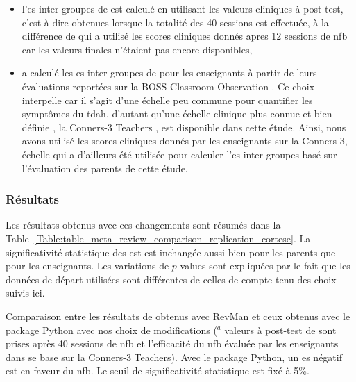 \begin{itemize}
\item l'\gls{es}-inter-groupes de \citet{Arnold2014} est calculé en utilisant les valeurs cliniques à post-test, c'est à dire obtenues lorsque la totalité 
des 40 sessions est effectuée, à la différence de \citet{Cortese2016} qui a utilisé les scores cliniques donnés apres 12 sessions de \gls{nfb} car les valeurs 
finales n'étaient pas encore disponibles,
\item \citet{Cortese2016} a calculé les \gls{es}-inter-groupes de \citet{Steiner2014} pour les enseignants à partir de leurs évaluations reportées sur 
la BOSS Classroom Observation \citep{Shapiro2010}. Ce choix interpelle car il s'agit d'une échelle peu commune pour quantifier les symptômes du \gls{tdah}, d'autant qu'une échelle clinique 
plus connue et bien définie \citep{Collett2003, Epstein2012, Bluschke2016}, la Conners-3 Teachers \citep{Conners1998, Conners2008}, est disponible dans 
cette étude. Ainsi, nous avons utilisé les scores cliniques donnés par les enseignants sur la Conners-3, échelle 
qui a d'ailleurs été utilisée pour calculer l'\gls{es}-inter-groupes basé sur l'évaluation des parents de cette étude. 
\end{itemize}

\subsubsection{Résultats}

Les résultats obtenus avec ces changements sont résumés dans la Table~\ref{Table:table_meta_review_comparison_replication_cortese}.
La significativité statistique des \gls{est} est inchangée aussi bien pour les parents que pour les enseignants. Les variations de $p$-values sont expliquées
par le fait que les données de départ utilisées sont différentes de celles de \citet{Cortese2016} compte tenu des choix suivis ici.

\begin{table}[h!]
  \centering
  \caption[Comparaison entre les résultats de \citet{Cortese2016} et ceux de la réplication avec nos choix de modifications.]{Comparaison entre les résultats de \citet{Cortese2016} obtenus avec RevMan \citep{Revman} et ceux obtenus avec le package Python \citep{Bussalb2019clinical}
	avec nos choix de modifications ($^a$ valeurs à post-test de \citet{Arnold2014} sont prises après 40 sessions de \gls{nfb} et l'efficacité du \gls{nfb} évaluée 
	par les enseignants dans \citet{Steiner2014} se base sur la Conners-3 Teachers).
	Avec le package Python, un \gls{es} négatif est en faveur du \gls{nfb}. Le seuil de significativité statistique est fixé à 5\%.}
  
  \label{Table:table_meta_review_comparison_replication_cortese}
\end{table}

